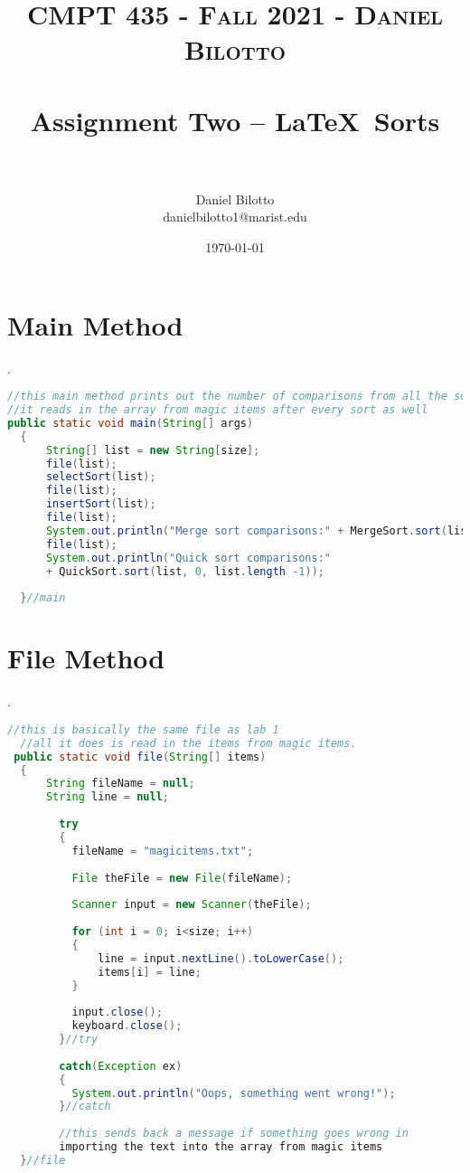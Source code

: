 \documentclass[letterpaper, 10pt]{article}
\title{	
   \normalfont \normalsize 
   \textsc{CMPT 435 - Fall 2021 - Daniel Bilotto} \\[10pt] %
   \horrule{0.5pt} \\[0.25cm] 	%
   \huge Assignment Two -- \LaTeX ~Sorts \\     	    %
   \horrule{0.5pt} \\[0.25cm] 	%
}
\author{Daniel Bilotto \\ \normalsize danielbilotto1@marist.edu}
\date{\normalsize\today} 	%
\begin{document}
\maketitle %


\section{Main Method}.
\begin{lstlisting}[language = java]
//this main method prints out the number of comparisons from all the sorts
//it reads in the array from magic items after every sort as well
public static void main(String[] args)
  {
	  String[] list = new String[size];
	  file(list);
	  selectSort(list);
	  file(list);
	  insertSort(list);
	  file(list);
	  System.out.println("Merge sort comparisons:" + MergeSort.sort(list));
	  file(list);
	  System.out.println("Quick sort comparisons:" 
	  + QuickSort.sort(list, 0, list.length -1));
    
  }//main

\end{lstlisting}

\section{File Method}.
\begin{lstlisting}[language = java]
  //this is basically the same file as lab 1
  //all it does is read in the items from magic items.
 public static void file(String[] items)
  {
	  String fileName = null;
	  String line = null;
	    
	    try
	    { 
	      fileName = "magicitems.txt";
	     
	      File theFile = new File(fileName);   
	      
	      Scanner input = new Scanner(theFile);
	    		 
	      for (int i = 0; i<size; i++)
	      {
	    	  line = input.nextLine().toLowerCase();
	    	  items[i] = line;
	      }
	   
	      input.close();
	      keyboard.close();
	    }//try
	    
	    catch(Exception ex)
	    {
	      System.out.println("Oops, something went wrong!");
	    }//catch
	    
	    //this sends back a message if something goes wrong in 
	    importing the text into the array from magic items
  }//file
  

\end{lstlisting}
\end{document}
